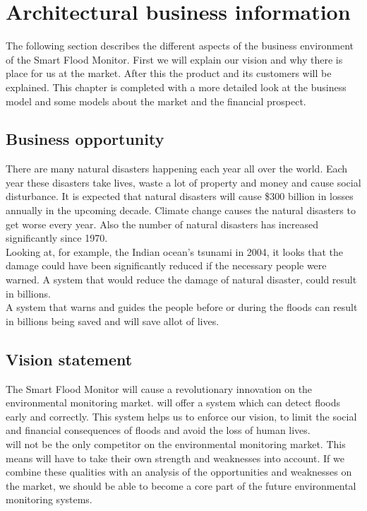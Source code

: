 \chapter{Architectural business information}
\label{ch:business}
The following section describes the different aspects of the business environment of the Smart Flood Monitor. First we will explain our vision and why there is place for us at the market. After this the product and its customers will be explained. This chapter is completed with a more detailed look at the business model and some models about the market and the financial prospect.

\section{Business opportunity}
There are many natural disasters happening each year all over the world. Each year these disasters take lives, waste a lot of property and money and cause social disturbance. It is expected that natural disasters will cause \$300 billion in losses annually in the upcoming decade. Climate change causes the natural disasters to get worse every year. Also the number of natural disasters has increased significantly since 1970.\\
Looking at, for example, the Indian ocean's tsunami in 2004, it looks that the damage could have been significantly reduced if the necessary people were warned. A system that would reduce the damage of natural disaster, could result in billions. \\
A system that warns and guides the people before or during the floods can result in billions being saved and will save allot of lives.

\section{Vision statement}
The Smart Flood Monitor will cause a revolutionary innovation on the environmental monitoring market. \CompanyName will offer a system which can detect floods early and correctly. This system helps us to enforce our vision, to limit the social and financial consequences of floods and avoid the loss of human lives. \\

\CompanyName will not be the only competitor on the environmental monitoring market. This means \CompanyName will have to take their own strength and weaknesses into account. If we combine these qualities with an analysis of the opportunities and weaknesses on the market, we should be able to become a core part of the future environmental monitoring systems.\\

